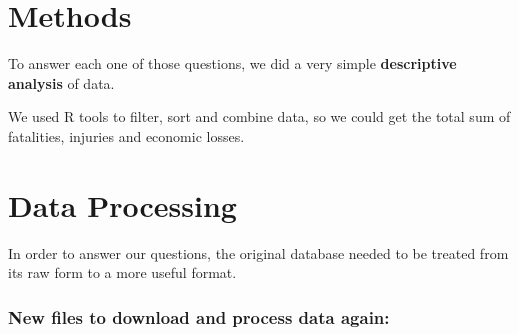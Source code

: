 \documentclass[]{article}
\begin{document}
\section{Methods}\label{methods}

To answer each one of those questions, we did a very simple
\textbf{descriptive analysis} of data.

We used R tools to filter, sort and combine data, so we could get the
total sum of fatalities, injuries and economic losses.

\section{Data Processing}\label{data-processing}

In order to answer our questions, the original database needed to be
treated from its raw form to a more useful format.

\subsubsection{New files to download and process data
again:}\label{new-files-to-download-and-process-data-again}
\end{document}
